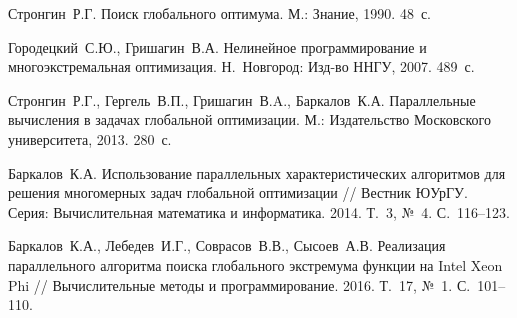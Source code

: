 \documentclass[11pt, oneside, a4paper]{article}
\begin{document}
\begin{biblio}

Стронгин~Р.Г. Поиск глобального оптимума. М.: Знание, 1990. 48~с.

Городецкий~С.Ю., Гришагин~В.А. Нелинейное программирование и многоэкстремальная оптимизация. Н.~Новгород: Изд-во ННГУ, 2007. 489~с.

Стронгин~Р.Г., Гергель~В.П., Гришагин~В.A., Баркалов~К.А. Параллельные вычисления в задачах глобальной оптимизации. М.: Издательство Московского университета, 2013. 280~с.

Баркалов~К.А. Использование параллельных характеристических алгоритмов для решения многомерных задач глобальной оптимизации  // Вестник ЮУрГУ. Серия: Вычислительная математика и информатика. 2014. Т.~3, №~4. С.~116--123.

Баркалов~К.А., Лебедев~И.Г., Соврасов~В.В., Сысоев~А.В. Реализация параллельного алгоритма поиска глобального экстремума функции на Intel Xeon Phi // Вычислительные методы и программирование. 2016. Т.~17, №~1. С.~101--110.



\end{biblio}
\end{document}
